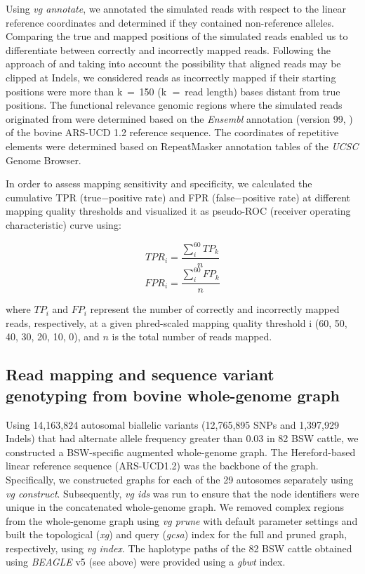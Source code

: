 \documentclass[../main.tex]{subfiles}
\begin{document}
Using \emph{vg annotate}, we annotated the simulated reads with respect to the linear reference coordinates and determined if they contained non-reference alleles. Comparing the true and mapped positions of the simulated reads enabled us to differentiate between correctly and incorrectly mapped reads. Following the approach of \citep{garrison2018variation} and taking into account the possibility that aligned reads may be clipped at Indels, we considered reads as incorrectly mapped if their starting positions were more than k $=$ 150 (k $=$ read length) bases distant from true positions. The functional relevance genomic regions where the simulated reads originated from were determined based on the \emph{Ensembl} annotation (version 99, \citep{yates2020ensembl}) of the bovine ARS-UCD 1.2 reference sequence. The coordinates of repetitive elements were determined based on RepeatMasker \citep{smith2013repeatmasker} annotation tables of the \emph{UCSC} Genome Browser.

In order to assess mapping sensitivity and specificity, we calculated the cumulative TPR (true$-$positive rate) and FPR (false$-$positive rate) at different mapping quality thresholds and visualized it as pseudo-ROC (receiver operating characteristic) curve \citep{garrison2018variation} using:

\[TPR_i=\frac{\sum_{i}^{60}TP_k}{n}\]
\[FPR_i=\frac{\sum_{i}^{60}FP_k}{n}\]

where $TP_i$ and $FP_i$ represent the number of correctly and incorrectly mapped reads, respectively, at a given phred-scaled mapping quality threshold i (60, 50, 40, 30, 20, 10, 0), and $n$ is the total number of reads mapped.

\subsection*{Read mapping and sequence variant genotyping from bovine whole-genome graph}

Using 14,163,824 autosomal biallelic variants (12,765,895 SNPs and 1,397,929 Indels) that had alternate allele frequency greater than 0.03 in 82 BSW cattle, we constructed a BSW-specific augmented whole-genome graph. The Hereford-based linear reference sequence (ARS-UCD1.2) was the backbone of the graph. Specifically, we constructed graphs for each of the 29 autosomes separately using \emph{vg construct}. Subsequently, \emph{vg ids} was run to ensure that the node identifiers were unique in the concatenated whole-genome graph. We removed complex regions from the whole-genome graph using \emph{vg prune} with default parameter settings and built the topological (\emph{xg}) and query (\emph{gcsa}) index for the full and pruned graph, respectively, using \emph{vg index}. The haplotype paths of the 82 BSW cattle obtained using \emph{BEAGLE} v5 (see above) were provided using a \emph{gbwt} index.
\end{document}
